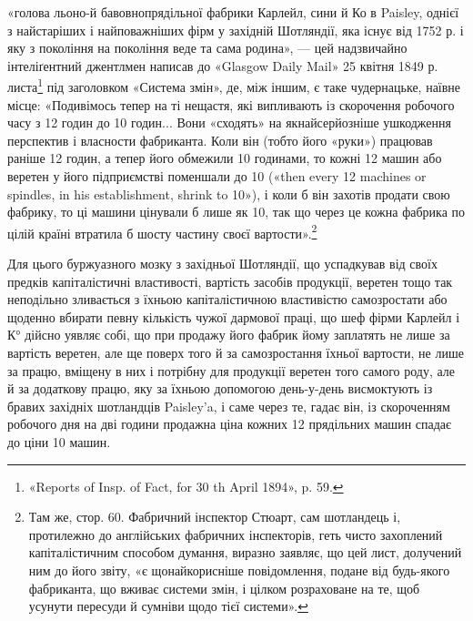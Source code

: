 \parcont{}  %
«голова льоно-й бавовнопрядільної фабрики Карлейл, сини й
Ко в Paisley, однієї з найстаріших і найповажніших фірм у західній
Шотляндії, яка існує від 1752 р. і яку з покоління на покоління
веде та сама родина», — цей надзвичайно інтеліґентний
джентлмен написав до «Glasgow Daily Mail» 25 квітня 1849 р.
листа\footnote{
«Reports of Insp. of Fact, for 30 th April 1894», p. 59.
} під заголовком «Система змін», де, між іншим, є таке
чудернацьке, наївне місце: «Подивімось тепер на ті нещастя,
які випливають із скорочення робочого часу з 12 годин до 10 годин...
Вони «сходять» на якнайсерйозніше ушкодження перспектив
і власности фабриканта. Коли він (тобто його «руки») працював
раніше 12 годин, а тепер його обмежили 10 годинами, то кожні
12 машин або веретен у його підприємстві поменшали до 10 («then
every 12 machines or spindles, in his establishment, shrink to 10»),
і коли б він захотів продати свою фабрику, то ці машини цінували
б лише як 10, так що через це кожна фабрика по цілій країні
втратила б шосту частину своєї вартости».\footnote{
Там же, стор. 60. Фабричний інспектор Стюарт, сам шотландець і,
протилежно до англійських фабричних інспекторів, геть чисто захоплений
капіталістичним способом думання, виразно заявляє, що цей лист,
долучений ним до його звіту, «є щонайкорисніше повідомлення, подане від
будь-якого фабриканта, що вживає системи змін, і цілком розраховане
на те, щоб усунути пересуди й сумніви щодо тієї системи».
}

Для цього буржуазного мозку з західньої Шотляндії, що
успадкував від своїх предків капіталістичні властивості, вартість
засобів продукції, веретен тощо так неподільно зливається з
їхньою капіталістичною властивістю самозростати або щоденно вбирати
певну кількість чужої дармової праці, що шеф фірми Карлейл
і К° дійсно уявляє собі, що при продажу його фабрик йому
заплатять не лише за вартість веретен, але ще поверх того й за
самозростання їхньої вартости, не лише за працю, вміщену в них
і потрібну для продукції веретен того самого роду, але й за додаткову
працю, яку за їхньою допомогою день-у-день висмоктують
із бравих західніх шотландців Paisley’a, і саме через те,
гадає він, із скороченням робочого дня на дві години продажна
ціна кожних 12 прядільних машин спадає до ціни 10 машин.
